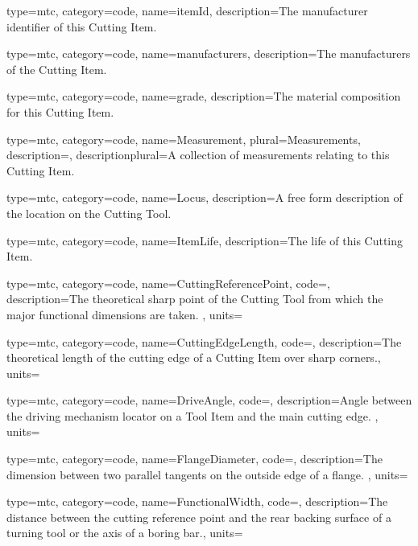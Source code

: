 {
  type=mtc,
  category=code,
  name={itemId},
  description={The manufacturer identifier of this Cutting Item. }
}


{
  type=mtc,
  category=code,
  name={manufacturers},
  description={The manufacturers of the Cutting Item. }
}


{
  type=mtc,
  category=code,
  name={grade},
  description={The material composition for this Cutting Item.}
}


{
  type=mtc,
  category=code,
  name={Measurement},
  plural={Measurements},
  description={},
  descriptionplural={A collection of measurements relating to this Cutting Item.}
}


{
  type=mtc,
  category=code,
  name={Locus},
  description={A free form description of the location on the Cutting Tool.}
}


{
  type=mtc,
  category=code,
  name={ItemLife},
  description={The life of this Cutting Item.}
}


{
  type=mtc,
  category=code,
  name={CuttingReferencePoint},
  code=,
  description={The theoretical sharp point of the Cutting Tool from which the major functional dimensions are taken. },
  units=
}


{
  type=mtc,
  category=code,
  name={CuttingEdgeLength},
  code=,
  description={The theoretical length of the cutting edge of a Cutting Item over sharp corners.},
  units=
}


{
  type=mtc,
  category=code,
  name={DriveAngle},
  code=,
  description={Angle between the driving mechanism locator on a Tool Item and the main cutting edge. },
  units=
}


{
  type=mtc,
  category=code,
  name={FlangeDiameter},
  code=,
  description={The dimension between two parallel tangents on the outside edge of a flange. },
  units=
}


{
  type=mtc,
  category=code,
  name={FunctionalWidth},
  code=,
  description={The distance between the cutting reference point and the rear backing surface of a turning tool or the axis of a boring bar.},
  units=
}


